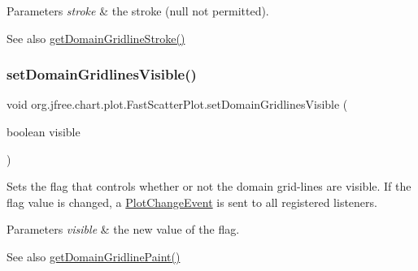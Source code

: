 \begin{DoxyParams}{Parameters}
{\em stroke} & the stroke ({\ttfamily null} not permitted).\\
\hline
\end{DoxyParams}
\begin{DoxySeeAlso}{See also}
\mbox{\hyperlink{classorg_1_1jfree_1_1chart_1_1plot_1_1_fast_scatter_plot_ab2565956fc394a1587e83ce684bdad97}{get\+Domain\+Gridline\+Stroke()}} 
\end{DoxySeeAlso}
\mbox{\label{classorg_1_1jfree_1_1chart_1_1plot_1_1_fast_scatter_plot_ac18fa3c1d2d933d3057a756e823f6d50}} 
\subsubsection{\texorpdfstring{set\+Domain\+Gridlines\+Visible()}{setDomainGridlinesVisible()}}
{\footnotesize\ttfamily void org.\+jfree.\+chart.\+plot.\+Fast\+Scatter\+Plot.\+set\+Domain\+Gridlines\+Visible (\begin{DoxyParamCaption}\item[{boolean}]{visible }\end{DoxyParamCaption})}

Sets the flag that controls whether or not the domain grid-\/lines are visible. If the flag value is changed, a \mbox{\hyperlink{}{Plot\+Change\+Event}} is sent to all registered listeners.


\begin{DoxyParams}{Parameters}
{\em visible} & the new value of the flag.\\
\hline
\end{DoxyParams}
\begin{DoxySeeAlso}{See also}
\mbox{\hyperlink{classorg_1_1jfree_1_1chart_1_1plot_1_1_fast_scatter_plot_a7b1602a024385bab17b05b27b0f55cda}{get\+Domain\+Gridline\+Paint()}} 
\end{DoxySeeAlso}
\mbox{\label{classorg_1_1jfree_1_1chart_1_1plot_1_1_fast_scatter_plot_aeb43d9a8a2df5a58a4fd45a560cf525e}} 
